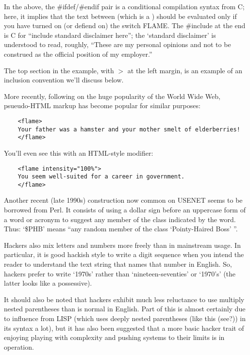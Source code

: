 In the above, the \#ifdef/\#endif pair is a conditional compilation syntax from C; here, it implies that the text between (which is a
) should be evaluated only if you have turned on (or defiend on) the switch FLAME. The \#include at the end is C for
``include standard disclaimer here''; the `standard disclaimer' is understood to read, roughly, ``These are my personal opinions and not to
be construed as the official position of my employer.''

The top section in the example, with $>$ at the left margin, is an example of an inclusion convention we'll discuss below.

More recently, following on the huge popularity of the World Wide Web, psueudo-HTML markup has become popular for similar purposes:

\begin{verbatim}
	<flame>
	Your father was a hamster and your mother smelt of elderberries!
	</flame>
\end{verbatim}

You'll even see this with an HTML-style modifier:

\begin{verbatim}
	<flame intensity="100%">
	You seem well-suited for a career in government.
	</flame>
\end{verbatim}

Another recent (late 1990s) construction now common on USENET seems to be borrowed from Perl. It consists of using a dollar sign before an
uppercase form of a word or acronym to suggest any  member of the class indicated by the word. Thus: `\$PHB' means ``any
random member of the class `Pointy-Haired Boss' ''.

Hackers also mix letters and numbers more freely than in mainstream usage. In particular, it is good hackish style to write a digit
sequence when you intend the reader to understand the text string that names that number in English. So, hackers prefer to write `1970s'
rather than `nineteen-seventies' or `1970's' (the latter looks like a possessive).

It should also be noted that hackers exhibit much less reluctance to use multiply nested parentheses than is normal in English. Part of
this is almost certainly due to influence from LISP (which uses deeply nested parentheses (like this (see?)) in its syntax a lot), but it
has also been suggested that a more basic hacker trait of enjoying playing with complexity and pushing systems to their limits is in
operation.


